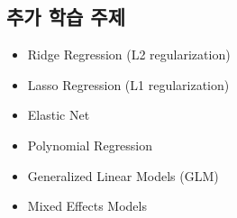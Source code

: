 \documentclass[12pt]{article}
\begin{document}
\subsection{추가 학습 주제}
\begin{itemize}
    \item Ridge Regression (L2 regularization)
    \item Lasso Regression (L1 regularization)
    \item Elastic Net
    \item Polynomial Regression
    \item Generalized Linear Models (GLM)
    \item Mixed Effects Models
\end{itemize}
\end{document}

